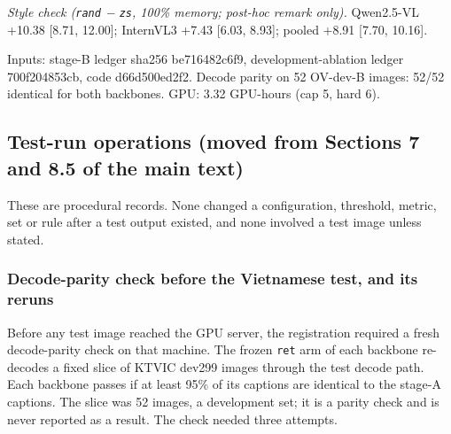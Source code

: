 \emph{Style check (\texttt{rand} − \texttt{zs}, 100\% memory; post-hoc remark only).} Qwen2.5-VL
+10.38 {[}8.71, 12.00{]}; InternVL3 +7.43 {[}6.03, 8.93{]}; pooled +8.91 {[}7.70, 10.16{]}.

Inputs: stage-B ledger sha256 be716482c6f9, development-ablation ledger 700f204853cb, code
d66d500ed2f2. Decode parity on 52 OV-dev-B images: 52/52 identical for both backbones. GPU: 3.32
GPU-hours (cap 5, hard 6).

\subsection{Test-run operations (moved from Sections 7 and 8.5 of the main
text)}\label{test-run-operations-moved-from-sections-7-and-8.5-of-the-main-text}

These are procedural records. None changed a configuration, threshold, metric, set or rule after a
test output existed, and none involved a test image unless stated.

\subsubsection{Decode-parity check before the Vietnamese test, and its
reruns}\label{decode-parity-check-before-the-vietnamese-test-and-its-reruns}

Before any test image reached the GPU server, the registration required a fresh decode-parity check
on that machine. The frozen \texttt{ret} arm of each backbone re-decodes a fixed slice of KTVIC
dev299 images through the test decode path. Each backbone passes if at least 95\% of its captions
are identical to the stage-A captions. The slice was 52 images, a development set; it is a parity
check and is never reported as a result. The check needed three attempts.

